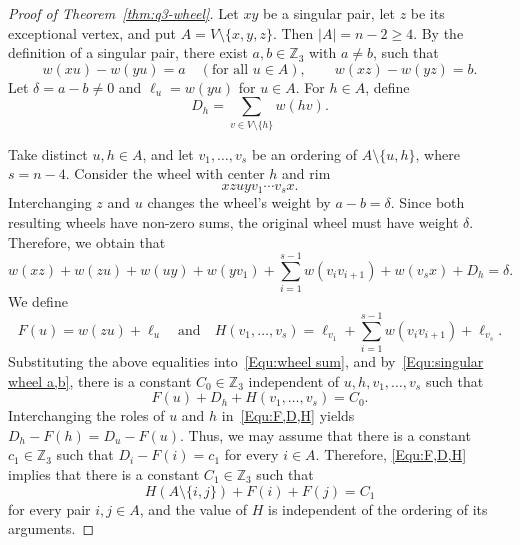 \documentclass[11pt]{article}
\theoremstyle{remark}
\newcommand{\Z}{\mathbb Z}
\begin{document}
\begin{proof}[Proof of Theorem~\ref{thm:q3-wheel}]
    Let $xy$ be a singular pair, let $z$ be its exceptional vertex, and put $A=V\setminus\{x,y,z\}$.
    Then $|A|=n-2\ge4$.
    By the definition of a singular pair, there exist $a,b\in\Z_3$ with $a\ne b$, such that
    \begin{equation}\label{Equ:singular wheel a,b}
        w(xu)-w(yu)=a\quad(\text{for all }u\in A),
        \qquad
        w(xz)-w(yz)=b.
    \end{equation}
    Let $\delta=a-b\ne0$ and $\ell_u=w(yu)$ for $u\in A$.  For $h\in A$, define
    \[
        D_h=\sum_{v\in V\setminus\{h\}}w(hv).
    \]

    Take distinct $u,h\in A$, and let $v_1,\ldots,v_s$ be an ordering of $A\setminus\{u,h\}$, where $s=n-4$.  Consider the wheel with center $h$ and rim
    \[
        xzuyv_1\cdots v_sx.
    \]
    Interchanging $z$ and $u$ changes the wheel's weight by $a-b=\delta$.
    Since both resulting wheels have non-zero sums, the original wheel must have weight $\delta$.
    Therefore, we obtain that
    \begin{equation}\label{Equ:wheel sum}
        w(xz)+w(zu)+w(uy)+w(yv_1)+\sum_{i=1}^{s-1}w(v_i v_{i+1})+w(v_sx)+D_h=\delta.
    \end{equation}
    We define
    \begin{equation}\label{Equ:define F and H}
        F(u)=w(zu)+\ell_u \quad \text{and}\quad
        H(v_1,\ldots,v_s)=\ell_{v_1}+\sum_{i=1}^{s-1}w(v_i v_{i+1})+\ell_{v_s}.
    \end{equation}
    Substituting the above equalities into~\eqref{Equ:wheel sum}, and by~\eqref{Equ:singular wheel a,b}, there is a constant $C_0\in \Z_3$ independent of $u,h,v_1,\ldots,v_s$ such that
    \begin{equation}\label{Equ:F,D,H}
        F(u)+D_h+H(v_1,\ldots,v_s)=C_0.
    \end{equation}
    Interchanging the roles of $u$ and $h$ in~\eqref{Equ:F,D,H} yields $D_h-F(h)=D_u-F(u)$.
    Thus, we may assume that there is a constant $c_1\in\Z_3$ such that $D_i-F(i)=c_1$ for every $i\in A$.
    Therefore, \eqref{Equ:F,D,H} implies that there is a constant $C_1\in\Z_3$ such that
    \begin{equation}\label{Equ:H+F+F=C}
        H(A\setminus\{i,j\})+F(i)+F(j)=C_1
    \end{equation}
    for every pair $i,j\in A$, and the value of $H$ is independent of the ordering of its arguments.


\end{proof}
\end{document}
